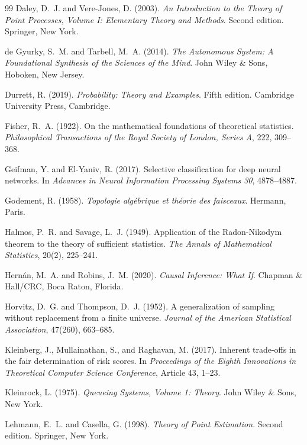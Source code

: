 \documentclass[11pt]{article}
\theoremstyle{definition}
\begin{document}
\begin{thebibliography}{99}
Daley, D.~J. and Vere-Jones, D. (2003).
\textit{An Introduction to the Theory of Point Processes, Volume I: Elementary Theory and Methods}.
Second edition.
Springer, New York.

de Gyurky, S.~M. and Tarbell, M.~A. (2014).
\textit{The Autonomous System: A Foundational Synthesis of the Sciences of the Mind}.
John Wiley \& Sons, Hoboken, New Jersey.

Durrett, R. (2019).
\textit{Probability: Theory and Examples}.
Fifth edition.
Cambridge University Press, Cambridge.

Fisher, R.~A. (1922).
On the mathematical foundations of theoretical statistics.
\textit{Philosophical Transactions of the Royal Society of London, Series A}, 222, 309--368.

Geifman, Y. and El-Yaniv, R. (2017).
Selective classification for deep neural networks.
In \textit{Advances in Neural Information Processing Systems 30}, 4878--4887.

Godement, R. (1958).
\textit{Topologie alg\'ebrique et th\'eorie des faisceaux}.
Hermann, Paris.

Halmos, P.~R. and Savage, L.~J. (1949).
Application of the Radon-Nikodym theorem to the theory of sufficient statistics.
\textit{The Annals of Mathematical Statistics}, 20(2), 225--241.

Hern\'an, M.~A. and Robins, J.~M. (2020).
\textit{Causal Inference: What If}.
Chapman \& Hall/CRC, Boca Raton, Florida.

Horvitz, D.~G. and Thompson, D.~J. (1952).
A generalization of sampling without replacement from a finite universe.
\textit{Journal of the American Statistical Association}, 47(260), 663--685.

Kleinberg, J., Mullainathan, S., and Raghavan, M. (2017).
Inherent trade-offs in the fair determination of risk scores.
In \textit{Proceedings of the Eighth Innovations in Theoretical Computer Science Conference}, Article 43, 1--23.

Kleinrock, L. (1975).
\textit{Queueing Systems, Volume 1: Theory}.
John Wiley \& Sons, New York.

Lehmann, E.~L. and Casella, G. (1998).
\textit{Theory of Point Estimation}.
Second edition.
Springer, New York.


\end{thebibliography}
\end{document}
